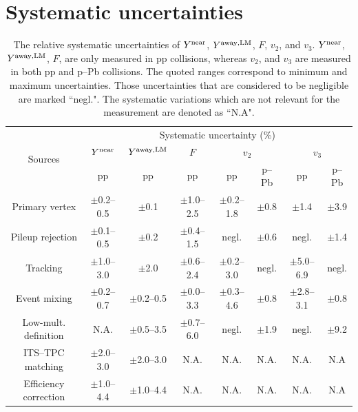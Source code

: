 
\section{Systematic uncertainties}
\label{sec:uncertainties}

\begin{table}[h!]
\caption{The relative systematic uncertainties of $Y^{\rm{near}}$, $Y^{\rm{away,LM}}$, $F$, $v_{2}$, and $v_{3}$. $Y^{\rm{near}}$, $Y^{\rm{away,LM}}$, $F$, are only measured in pp collisions, whereas $v_{2}$, and $v_{3}$ are measured in both pp and p--Pb collisions. The quoted ranges correspond to minimum and maximum uncertainties. Those uncertainties that are considered to be negligible are marked ``negl.". The systematic variations which are not relevant for the measurement are denoted as ``N.A".}
\centering
\label{tab:syst}
\resizebox{\textwidth}{!} {
\begin{tabular}{c|ccc|cccc}
\hline 
\multirow{3}{*}{Sources}  & \multicolumn{7}{c}{Systematic uncertainty (\%)} \\ \cline{2-8} 
& \multicolumn{1}{c}{$Y^{\rm{near}}$} & \multicolumn{1}{c}{$Y^{\rm{away,LM}}$} & \multicolumn{1}{c|}{$F$} & \multicolumn{2}{c}{$v_{2}$} & \multicolumn{2}{c}{$v_{3}$}  \\  \cline{2-8}
&pp &pp &pp & pp & p--Pb & pp & p--Pb  \\ \cline{1-8} 
Primary vertex       & $\pm$0.2--0.5 & $\pm$0.1      & $\pm$1.0--2.5 & $\pm$0.2--1.8 & $\pm$0.8 & $\pm$1.4 & $\pm$3.9 \\ 
Pileup rejection     & $\pm$0.1--0.5 & $\pm$0.2      & $\pm$0.4--1.5 & negl.         & $\pm$0.6 & negl. & $\pm$1.4 \\ 
Tracking		     & $\pm$1.0--3.0 & $\pm$2.0      & $\pm$0.6--2.4 & $\pm$0.2--3.0 & negl. & $\pm$5.0--6.9 & negl. \\ 
Event mixing	     & $\pm$0.2--0.7 & $\pm$0.2--0.5 & $\pm$0.0--3.3 & $\pm$0.3--4.6 & $\pm$0.8 & $\pm$2.8--3.1 & $\pm$0.8 \\ 
Low-mult. definition & N.A.          & $\pm$0.5--3.5 & $\pm$0.7--6.0 & negl.         & $\pm$1.9 & negl. & $\pm$9.2\\ 
ITS--TPC matching 	 & $\pm$2.0--3.0 & $\pm$2.0--3.0 & N.A.          & N.A.          & N.A. & N.A. & N.A\\ 
Efficiency correction& $\pm$1.0--4.4 & $\pm$1.0--4.4 & N.A.          & N.A.          & N.A. & N.A. & N.A\\ 

\end{tabular}}
\end{table}
